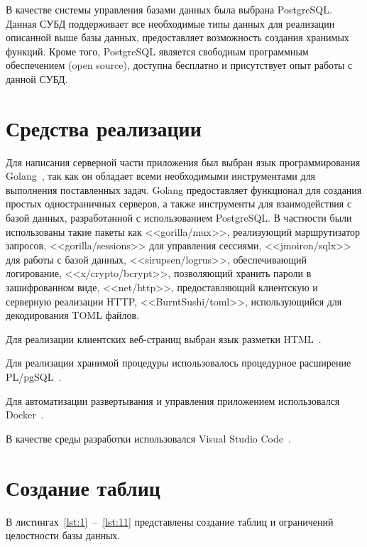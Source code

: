 В качестве системы управления базами данных была выбрана PostgreSQL.
Данная СУБД поддерживает все необходимые типы данных для реализации описанной выше базы данных, предоставляет возможность создания хранимых функций.
Кроме того, PostgreSQL является свободным программным обеспечением (open source), доступна бесплатно и присутствует опыт работы с данной СУБД.


\section{Средства реализации}

Для написания серверной части приложения был выбран язык программирования Golang~\cite{golang}, так как он обладает всеми необходимыми инструментами для выполнения поставленных задач. 
Golang предоставляет функционал для создания простых одностраничных серверов, а также инструменты для взаимодействия с базой данных, разработанной с использованием PostgreSQL.
В частности были использованы такие пакеты как 
<<gorilla/mux>>, реализующий маршрутизатор запросов, 
<<gorilla/sessions>> для управления сессиями, 
<<jmoiron/sqlx>> для работы с базой данных, 
<<sirupsen/logrus>>, обеспечивающий логирование, 
<<x/crypto/bcrypt>>, позволяющий хранить пароли в зашифрованном виде, 
<<net/http>>, предоставляющий клиентскую и серверную реализации HTTP, 
<<BurntSushi/toml>>, использующийся для декодирования TOML файлов.

Для реализации клиентских веб-страниц выбран язык разметки HTML~\cite{html}.

Для реализации хранимой процедуры использовалось процедурное расширение PL/pgSQL~\cite{plpgsql}.

Для автоматизации развертывания и управления приложением использовался Docker~\cite{docker}.

В качестве среды разработки использовался Visual Studio Code~\cite{vscode}.

\section{Создание таблиц}

В листингах~\ref{lst:1}~--~\ref{lst:11} представлены создание таблиц и ограничений целостности базы данных.


